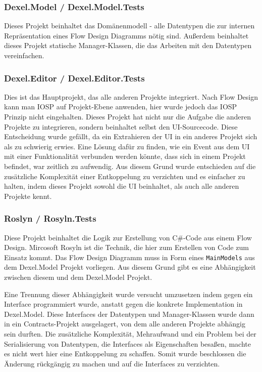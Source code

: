 \subsubsection{Dexel.Model / Dexel.Model.Tests}

Dieses Projekt beinhaltet das Domänenmodell - alle Datentypen die zur internen Repräsentation
eines Flow Design Diagramms nötig sind. Außerdem beinhaltet dieses Projekt
statische Manager-Klassen, die das Arbeiten mit den Datentypen vereinfachen.

\subsubsection{Dexel.Editor / Dexel.Editor.Tests}

Dies ist das Hauptprojekt, das alle anderen Projekte integriert.
Nach Flow Design kann man IOSP auf Projekt-Ebene anwenden, hier wurde jedoch das IOSP
Prinzip nicht eingehalten. Dieses Projekt hat nicht nur die Aufgabe die
anderen Projekte zu integrieren, sondern beinhaltet selbst den
UI-Sourcecode. Diese Entscheidung wurde gefällt, da ein Extrahieren der UI
in ein anderes Projekt sich als zu schwierig erwies. Eine Lösung dafür zu
finden, wie ein Event aus dem UI mit einer Funktionalität verbunden werden
könnte, dass sich in einem Projekt befindet, war zeitlich zu
aufwendig. Aus diesem Grund wurde entschieden auf die zusätzliche
Komplexität einer Entkoppelung zu verzichten und es einfacher zu halten, indem
dieses Projekt sowohl die UI beinhaltet, als auch alle anderen Projekte
kennt.

\subsubsection{Roslyn / Rosyln.Tests}

Diese Projekt beinhaltet die Logik zur Erstellung von C\#-Code aus einem Flow
Design. Mircosoft Rosyln ist die Technik, die hier zum Erstellen von Code zum
Einsatz kommt.
Das Flow Design Diagramm muss in Form eines \texttt{MainModels} aus dem
Dexel.Model Projekt vorliegen. Aus diesem Grund gibt es eine Abhängigkeit
zwischen diesem und dem Dexel.Model Projekt. 

Eine Trennung dieser Abhängigkeit wurde versucht umzusetzen indem gegen ein Interface
programmiert wurde, anstatt gegen die konkrete Implementation in
Dexel.Model. Diese Interfaces der Datentypen und Manager-Klassen wurde dann
in ein Contracts-Projekt ausgelagert, von dem alle anderen Projekte abhängig
sein durften. Die zusätzliche Komplexität, Mehraufwand und ein Problem bei
der Serialisierung von Datentypen, die Interfaces als Eigenschaften besaßen,
machte es nicht wert hier eine Entkoppelung zu schaffen. Somit wurde beschlossen die Änderung rückgängig zu machen und auf die Interfaces zu verzichten.

